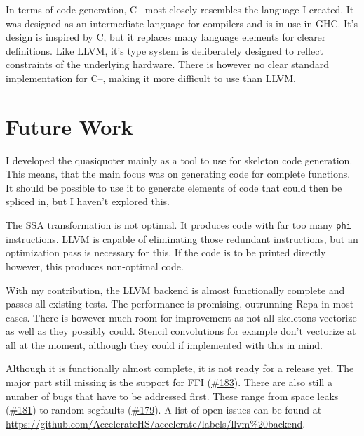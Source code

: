 \documentclass[a4paper,bibliography=totocnumbered,parskip,headsepline]{scrbook}
\begin{document}
In terms of code generation, C-- most closely resembles the language I created.
It was designed as an intermediate language for compilers and is in use in GHC.
It's design is inspired by C, but it replaces many language elements for clearer definitions.
Like LLVM, it's type system is deliberately designed to reflect constraints of the underlying hardware.
There is however no clear standard implementation for C--, making it more difficult to use than LLVM.

\section{Future Work}
I developed the quasiquoter mainly as a tool to use for skeleton code generation.
This means, that the main focus was on generating code for complete functions.
It should be possible to use it to generate elements of code that could then be spliced in, but I haven't explored this.

The SSA transformation is not optimal.
It produces code with far too many \lstinline!phi! instructions.
LLVM is capable of eliminating those redundant instructions, but an optimization pass is necessary for this.
If the code is to be printed directly however, this produces non-optimal code.

With my contribution, the LLVM backend is almost functionally complete and passes all existing tests.
The performance is promising, outrunning Repa in most cases.
There is however much room for improvement as not all skeletons vectorize as well as they possibly could.
Stencil convolutions for example don't vectorize at all at the moment, although they could if implemented with this in mind.

Although it is functionally almost complete, it is not ready for a release yet.
The major part still missing is the support for FFI (\href{https://github.com/AccelerateHS/accelerate/issues/183}{\#183}).
There are also still a number of bugs that have to be addressed first.
These range from space leaks (\href{https://github.com/AccelerateHS/accelerate/issues/181}{\#181}) to random segfaults (\href{https://github.com/AccelerateHS/accelerate/issues/179}{\#179}).
A list of open issues can be found at \url{https://github.com/AccelerateHS/accelerate/labels/llvm%20backend}.


\appendix

\backmatter
\sloppy
\printbibliography[heading=bibintoc]
\end{document}
